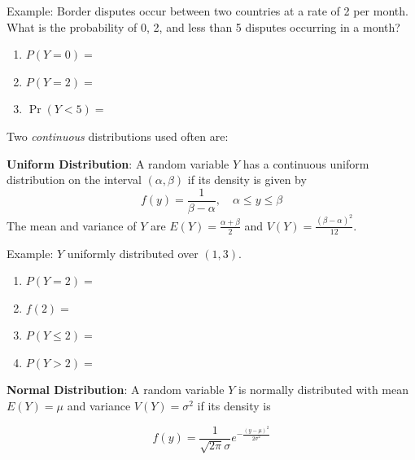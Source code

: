 \documentclass[]{book}
\theoremstyle{definition}
\theoremstyle{definition}
\theoremstyle{definition}
\theoremstyle{remark}
\begin{document}
\begin{framed}
Example: Border disputes occur between two countries at a rate of 2 per month.  What is the probability of 0, 2, and less than 5 disputes occurring in a month?\\
\parbox[c]{4.25in}{
  \begin{enumerate}
  \item $P(Y=0)=$ 
  \item $P(Y=2)=$ 
  \item $\Pr(Y<5)=$ 
  \end{enumerate}}

\end{framed}

Two \emph{continuous} distributions used often are:

\textbf{Uniform Distribution}: A random variable \(Y\) has a continuous
uniform distribution on the interval \((\alpha,\beta)\) if its density
is given by \[f(y)=\frac{1}{\beta-\alpha}, \quad \alpha\le y\le \beta\]
The mean and variance of \(Y\) are \(E(Y)=\frac{\alpha+\beta}{2}\) and
\(V(Y)=\frac{(\beta-\alpha)^2}{12}\).

\begin{framed}
Example: $Y$ uniformly distributed over $(1,3)$.\\
 \parbox[c]{4.25in}{
 \begin{enumerate}
 \item $P(Y=2) = $
 \item $f(2) = $
 \item $P(Y\le 2) = $
 \item $P(Y > 2) =$
\end{enumerate}}

\end{framed}

\textbf{Normal Distribution}: A random variable \(Y\) is normally
distributed with mean \(E(Y)=\mu\) and variance \(V(Y)=\sigma^2\) if its
density is

\[f(y)=\frac{1}{\sqrt{2\pi}\sigma}e^{-\frac{(y-\mu)^2}{2\sigma^2}}\]

\end{document}
